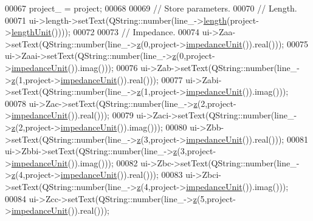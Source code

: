 \begin{DoxyCode}
00067   project\_ = project;
00068 
00069   \textcolor{comment}{// Store parameters.}
00070   \textcolor{comment}{// Length.}
00071   ui->length->setText(QString::number(line\_->\hyperlink{group___models_gae2e4500d0fa60dcc2ecb08b2c96954f9}{length}(project->\hyperlink{class_project_a40cd2f59a4a708897e5997942c046f4d}{lengthUnit}())));
00072 
00073   \textcolor{comment}{// Impedance.}
00074   ui->Zaa->setText(QString::number(line\_->\hyperlink{group___models_gab5370574fd93e13eb11742f7753fe1f1}{z}(0,project->\hyperlink{class_project_ad0725b9aa4445dd6d21d4e15df482d3b}{impedanceUnit}()).real()));
00075   ui->Zaai->setText(QString::number(line\_->\hyperlink{group___models_gab5370574fd93e13eb11742f7753fe1f1}{z}(0,project->\hyperlink{class_project_ad0725b9aa4445dd6d21d4e15df482d3b}{impedanceUnit}()).imag()));
00076   ui->Zab->setText(QString::number(line\_->\hyperlink{group___models_gab5370574fd93e13eb11742f7753fe1f1}{z}(1,project->\hyperlink{class_project_ad0725b9aa4445dd6d21d4e15df482d3b}{impedanceUnit}()).real()));
00077   ui->Zabi->setText(QString::number(line\_->\hyperlink{group___models_gab5370574fd93e13eb11742f7753fe1f1}{z}(1,project->\hyperlink{class_project_ad0725b9aa4445dd6d21d4e15df482d3b}{impedanceUnit}()).imag()));
00078   ui->Zac->setText(QString::number(line\_->\hyperlink{group___models_gab5370574fd93e13eb11742f7753fe1f1}{z}(2,project->\hyperlink{class_project_ad0725b9aa4445dd6d21d4e15df482d3b}{impedanceUnit}()).real()));
00079   ui->Zaci->setText(QString::number(line\_->\hyperlink{group___models_gab5370574fd93e13eb11742f7753fe1f1}{z}(2,project->\hyperlink{class_project_ad0725b9aa4445dd6d21d4e15df482d3b}{impedanceUnit}()).imag()));
00080   ui->Zbb->setText(QString::number(line\_->\hyperlink{group___models_gab5370574fd93e13eb11742f7753fe1f1}{z}(3,project->\hyperlink{class_project_ad0725b9aa4445dd6d21d4e15df482d3b}{impedanceUnit}()).real()));
00081   ui->Zbbi->setText(QString::number(line\_->\hyperlink{group___models_gab5370574fd93e13eb11742f7753fe1f1}{z}(3,project->\hyperlink{class_project_ad0725b9aa4445dd6d21d4e15df482d3b}{impedanceUnit}()).imag()));
00082   ui->Zbc->setText(QString::number(line\_->\hyperlink{group___models_gab5370574fd93e13eb11742f7753fe1f1}{z}(4,project->\hyperlink{class_project_ad0725b9aa4445dd6d21d4e15df482d3b}{impedanceUnit}()).real()));
00083   ui->Zbci->setText(QString::number(line\_->\hyperlink{group___models_gab5370574fd93e13eb11742f7753fe1f1}{z}(4,project->\hyperlink{class_project_ad0725b9aa4445dd6d21d4e15df482d3b}{impedanceUnit}()).imag()));
00084   ui->Zcc->setText(QString::number(line\_->\hyperlink{group___models_gab5370574fd93e13eb11742f7753fe1f1}{z}(5,project->\hyperlink{class_project_ad0725b9aa4445dd6d21d4e15df482d3b}{impedanceUnit}()).real()));

\end{DoxyCode}
